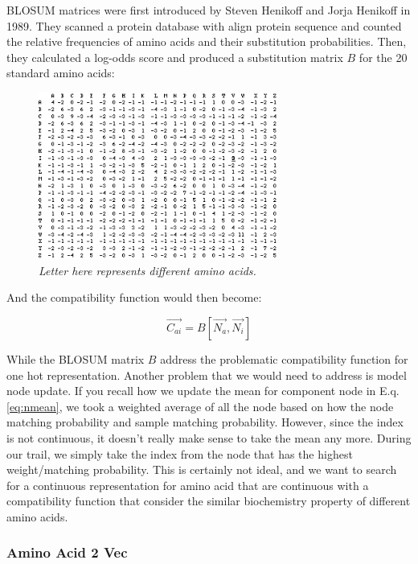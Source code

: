 BLOSUM matrices were first introduced by Steven Henikoff and Jorja Henikoff in 1989. They scanned a protein database with align protein sequence and counted the relative frequencies of amino acids and their substitution probabilities. Then, they calculated a log-odds score and produced a substitution matrix $B$ for the 20 standard amino acids:

\begin{figure}[h]
	\centering
	\captionsetup{justification=centering}
	\includegraphics[width=0.7\textwidth]{figs/blosum.png}
	\caption[Caption for LOF]{\emph{Letter here represents different amino acids.}}
	\label{fig:blosum}
\end{figure}

And the compatibility function would then become:

\begin{equation} 
\overrightarrow{C_{ai}}=B[\overrightarrow{N_a},\overrightarrow{N_i}]
\end{equation}

While the BLOSUM matrix $B$ address the problematic compatibility function for one hot representation. Another problem that we would need to address is model node update. If you recall how we update the mean for component node in E.q. \ref{eq:nmean}, we took a weighted average of all the node based on how the node matching probability and sample matching probability. However, since the index is not continuous, it doesn't really make sense to take the mean any more. During our trail, we simply take the index from the node that has the highest weight/matching probability. This is certainly not ideal, and we want to search for a continuous representation for amino acid that are continuous with a compatibility function that consider the similar biochemistry property of different amino acids.

\subsubsection{Amino Acid 2 Vec}

